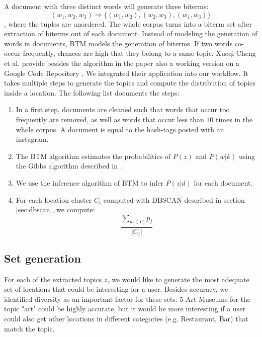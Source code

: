 A document with three distinct words will generate three biterms: \[(w_1, w_2, w_3) \Rightarrow \{(w_1, w_2), (w_2, w_3), (w_1, w_3)\}
\], where the tuples are unordered. The whole corpus turns into a biterm set after extraction of biterms out of each document. Instead of modeling the generation of words in documents, BTM models the generation of biterms. If two words co-occur frequently, chances are high that they belong to a same topic. Xueqi Cheng et al. provide besides the algorithm in the paper also a working version on a Google Code Repository \cite{btm-website}. We integrated their application into our workflow. It takes multiple steps to generate the topics and compute the distribution of topics inside a location. The following list documents the steps:
\begin{enumerate}
  \item In a first step, documents are cleaned such that words that occur too frequently are removed, as well as words that occur less than $10$ times in the whole corpus. A document is equal to the hash-tags posted with an instagram.
  \item The BTM algorithm estimates the probabilities of $P(z)$ and $P(w|k)$ using the Gibbs algorithm described in \cite{btm}.
  \item We use the inference algorithm of BTM to infer $P(z|d)$ for each document.
  \item For each location cluster $C_i$ computed with DBSCAN described in section \ref{sec:dbscan}, we compute: \[
  \frac{\sum_{p_j \in C_i} p_j}{|C_i|}
  \]
\end{enumerate}

\subsection{Set generation}

For each of the extracted topics $z$, we would like to generate the most adequate set of locations that could be interesting for a user. Besides accuracy, we identified diversity as an important factor for these sets: $5$ Art Museums for the topic "art" could be highly accurate, but it would be more interesting if a user could also get other locations in different categories (e.g. Restaurant, Bar) that match the topic.

